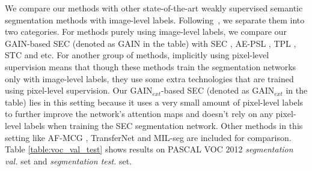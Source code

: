 \documentclass[10pt,twocolumn,letterpaper]{article}
\begin{document}
We compare our methods with other state-of-the-art weakly supervised semantic segmentation methods with image-level labels. Following~\cite{wei2017object}, we separate them into two categories. For methods purely using image-level labels, we compare our GAIN-based SEC (denoted as GAIN in the table) with SEC \cite{kolesnikov2016seed}, AE-PSL \cite{wei2017object}, TPL \cite{kim2017two}, STC \cite{wei2017stc} and etc. For another group of methods, implicitly using pixel-level supervision means that though these methods train the segmentation networks only with image-level labels, they use some extra technologies that are trained using pixel-level supervision. Our GAIN$_{ext}$-based SEC (denoted as GAIN$_{ext}$ in the table) lies in this setting because it uses a very small amount of pixel-level labels to further improve the network's attention maps and doesn't rely on any pixel-level labels when training the SEC segmentation network. Other methods in this setting like AF-MCG \cite{zhou2016learning}, TransferNet \cite{hong2016learning} and MIL-seg \cite{pinheiro2015image} are included for comparison. Table \ref{table:voc_val_test} shows results on PASCAL VOC 2012 \emph{segmentation val.} set and \emph{segmentation test.} set.





\end{document}
